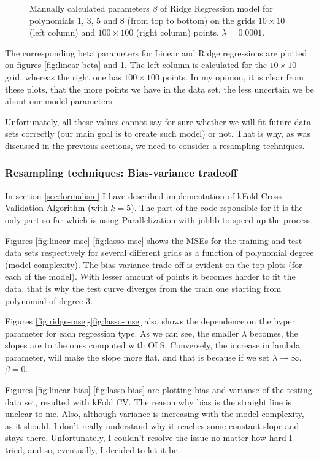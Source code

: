 \begin{figure}[!ht]
\begin{subfigure}{\textwidth}
\end{subfigure}
\caption{Manually calculated parameters $\beta$ of Ridge Regression model for polynomials 1, 3, 5 and 8 (from top to bottom) on the grids $10\times10$ (left column) and $100\times100$ (right column) points. $\lambda = 0.0001$.}
\label{fig:ridge-beta}
\end{figure}

The corresponding beta parameters for Linear and Ridge regressions are plotted on figures \ref{fig:linear-beta} and \ref{fig:ridge-beta}. The left column is calculated for the $10\times10$ grid, whereas the right one has $100\times100$ points. In my opinion, it is clear from these plots, that the more points we have in the data set, the less uncertain we be about our model parameters.

Unfortunately, all these values cannot say for sure whether we will fit future data sets correctly (our main goal is to create such model) or not. That is why, as was discussed in the previous sections, we need to consider a resampling techniques. 

 \subsubsection{Resampling techniques: Bias-variance tradeoff}
 
 In section \ref{sec:formalism} I have described implementation of kFold Cross Validation Algorithm (with $k=5$). The part of the code rsponsible for it is the only part so far which is using  Parallelization with joblib to speed-up the process.
 
 Figures \ref{fig:linear-mse}-\ref{fig:lasso-mse} shows the MSEs for the training and test data sets respectively for several different grids as a function of polynomial degree (model complexity). The bias-variance trade-off is evident on the top plots (for each of the model). With lesser amount of points it becomes harder to fit the data, that is why the test curve diverges from the train one starting from polynomial of degree 3. 
 
 Figures \ref{fig:ridge-mse}-\ref{fig:lasso-mse} also shows the dependence on the hyper parameter for each regression type. As we can see, the smaller $\lambda$ becomes, the slopes are to the ones computed with OLS. Conversely, the increase in lambda parameter, will make the slope more flat, and that is because if we set $\lambda\rightarrow\infty$, $\beta=0$.
 
 Figures \ref{fig:linear-bias}-\ref{fig:lasso-bias} are plotting bias and varianse of the testing data set, resulted with kFold CV. The reason why bias is the straight line is unclear to me. Also, although variance is increasing with the model complexity, as it should, I don't really understand why it reaches some constant slope and stays there. Unfortunately, I couldn't resolve the issue no matter how hard I tried, and so, eventually, I decided to let it be.
 
